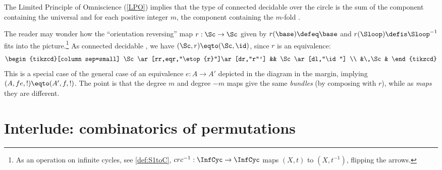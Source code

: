 \begin{lemma}
  \label{lem:componentsofcoversofS1}
  The Limited Principle of Omniscience (\cref{LPO})
  implies that the type of connected decidable \coverings over the circle is the sum
of the component containing the universal \covering and for each positive integer $m$,
the component containing the $m$-fold \covering.
\end{lemma}

\begin{remark}
  \label{rem:flipthecircle}
The reader may wonder how the ``orientation reversing'' map $r:\Sc\to \Sc$ given
by $r(\base)\defeq\base$ and $r(\Sloop)\defis\Sloop^{-1}$ fits into the picture.\footnote{%
  As an operation on infinite cycles, see \cref{def:S1toC},
  $c r c^{-1} : \InfCyc\to\InfCyc$ maps $(X,t)$ to $(X,t^{-1})$,
  flipping the arrows.}
As connected decidable \coverings, we have
$(\Sc,r) \eqto (\Sc,\id)$, since $r$ is an equivalence:
\[
  \begin{tikzcd}[column sep=small]
    \Sc\ar[rr,eqr,"\etop{r}"]\ar[dr,"r"'] && \Sc\ar[dl,"\id"] \\
    &\,\Sc&
  \end{tikzcd}
\]
This is a special case of the general case of an equivalence
$e: A\to A'$ depicted in the diagram in the margin, 
implying $(A,fe,!)\eqto(A',f,!)$.
The point is that the degree $m$ and degree $-m$ maps give the same \emph{bundles} (by composing with $r$), while as \emph{maps} they are different.
\end{remark}

\section{Interlude: combinatorics of permutations}

